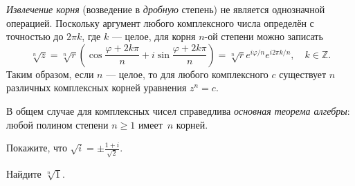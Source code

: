\begin{labsupplement}
    \emph{Извлечение корня} (возведение в \emph{дробную} степень) не является
    однозначной операцией. Поскольку аргумент любого комплексного числа определён
    с точностью до $2\pi k$, где $k$ --- целое, для корня $n$-ой степени
    можно записать
    \begin{equation*}
        \sqrt[n]{z} = \sqrt[n]{r}\left( \cos\frac{\varphi + 2k\pi}{n} +
        i\sin\frac{\varphi + 2k\pi}{n} \right) = \sqrt[n]{r} e^{i\varphi/n}
        e^{i2\pi k/n},\quad k\in \mathbb{Z}.
    \end{equation*}
    Таким образом, если $n$ --- целое, то для любого комплексного $c$
    существует $n$ различных комплексных корней уравнения $z^n=c$.

    В общем случае для комплексных чисел справедлива
    \emph{основная теорема алгебры}: любой полином степени $n\ge 1$ имеет~$n$
    корней.

    \begin{lab:exercise}
     Покажите, что $\sqrt{i}=\pm \frac{1+i}{\sqrt{2}}$.
    \end{lab:exercise}
    \begin{lab:exercise}
     Найдите $\sqrt[n]{1}$.
    \end{lab:exercise}

\end{labsupplement}
